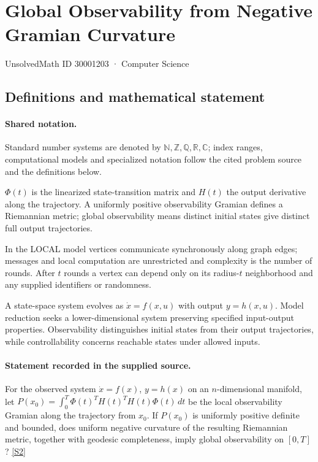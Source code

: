 \documentclass[11pt]{article}
\newcommand{\sref}[2]{\hyperlink{source:#1:#2}{[S#2]}}
\begin{document}
\setcounter{section}{30001202}
\section{Global Observability from Negative Gramian Curvature}\label{30001203}
{\small\sffamily UnsolvedMath ID 30001203 · Computer Science}
\subsection{Definitions and mathematical statement}

\paragraph{Shared notation.}Standard number systems are denoted by $\mathbb N,\mathbb Z,\mathbb Q,\mathbb R,\mathbb C$; index ranges, computational models and specialized notation follow the cited problem source and the definitions below.


$\Phi(t)$ is the linearized state-transition matrix and $H(t)$ the output derivative along the trajectory. A uniformly positive observability Gramian defines a Riemannian metric; global observability means distinct initial states give distinct full output trajectories.

In the LOCAL model vertices communicate synchronously along graph edges; messages and local computation are unrestricted and complexity is the number of rounds. After $t$ rounds a vertex can depend only on its radius-$t$ neighborhood and any supplied identifiers or randomness.

A state-space system evolves as $\dot x=f(x,u)$ with output $y=h(x,u)$. Model reduction seeks a lower-dimensional system preserving specified input-output properties. Observability distinguishes initial states from their output trajectories, while controllability concerns reachable states under allowed inputs.
\paragraph{Statement recorded in the supplied source.}
For the observed system $\dot{x}=f(x)$, $y=h(x)$ on an $n$-dimensional manifold, let $P(x_0)=\int_0^T\Phi(t)^TH(t)^TH(t)\Phi(t)\,dt$ be the local observability Gramian along the trajectory from $x_0$. If $P(x_0)$ is uniformly positive definite and bounded, does uniform negative curvature of the resulting Riemannian metric, together with geodesic completeness, imply global observability on $[0,T]$? \sref{30001203}{2}
\end{document}
